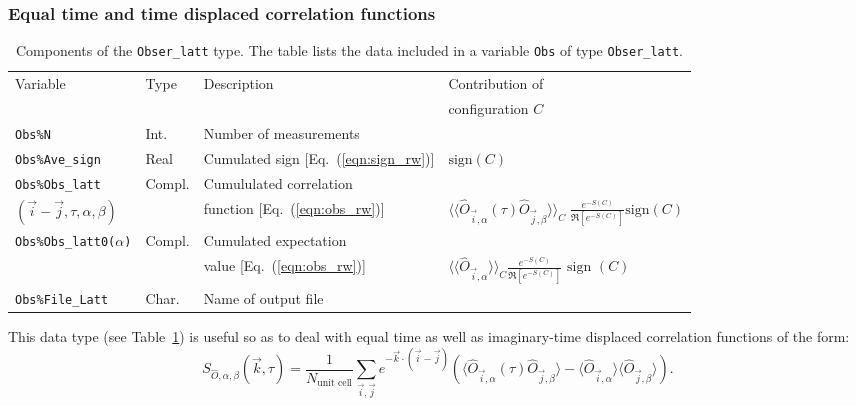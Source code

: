 \documentclass{SciPost}
\begin{document}
\subsubsection{ Equal time and time displaced correlation functions}
%
\begin{table}[h]
   \begin{tabular}{@{} l l l l @{}}\toprule
        Variable  &  Type      &  Description &  Contribution of  \\
        &  & & configuration $C$ \\\midrule
    \texttt{Obs\%N}                       &  Int.        &   Number of measurements &  \\
    \texttt{Obs\%Ave\_sign}  
    &  Real  &    Cumulated sign [Eq.~(\ref{eqn:sign_rw})] & $\text{sign}(C)$  \\
    \texttt{Obs\%Obs\_latt}        & Compl.      &    Cumululated  correlation & \\
     $(\vec{i}-\vec{j},\tau,\alpha,\beta)$  &     &  function [Eq.~(\ref{eqn:obs_rw})] &  $ \langle \langle \hat{O}_{\vec{i},\alpha} (\tau) \hat{O}_{\vec{j},\beta} \rangle \rangle_{C} \; \frac{e^{-S(C)}} {\Re \left[e^{-S(C)} \right]}  \text{sign}(C) $ \\
     \texttt{Obs\%Obs\_latt0($\alpha$)}        & Compl.      &    Cumulated expectation &   \\
             &     &    value [Eq.~(\ref{eqn:obs_rw})] &   $ \langle \langle \hat{O}_{\vec{i},\alpha} \rangle \rangle_{C}\frac{e^{-S(C)}} {\Re \left[e^{-S(C)} \right]}  \text{ sign }(C) $ \\
     \texttt{Obs\%File\_Latt}           &  Char.    &    Name of output file  &\\\bottomrule
   \end{tabular}
   \caption{Components of the \texttt{Obser\_latt}  type.  The table lists the data included in a variable  \texttt{Obs}  of type \texttt{Obser\_latt}.
      \label{table:Obser_latt}}
\end{table}
%
This data type (see Table~\ref{table:Obser_latt}) is useful so as to deal with  equal time as well as imaginary-time displaced correlation functions of the form: 
\begin{equation}\label{eqn:s}
	S_{\hat{O},\alpha,\beta}(\vec{k},\tau) =   \frac{1}{N_{\text{unit cell}}} \sum_{\vec{i},\vec{j}}  e^{- \vec{k} \cdot \left( \vec{i}-\vec{j}\right) } \left( \langle \hat{O}_{\vec{i},\alpha} (\tau) \hat{O}_{\vec{j},\beta} \rangle  - 
	  \langle \hat{O}_{\vec{i},\alpha} \rangle \langle   \hat{O}_{\vec{j},\beta}  \rangle \right).
\end{equation}
\end{document}
